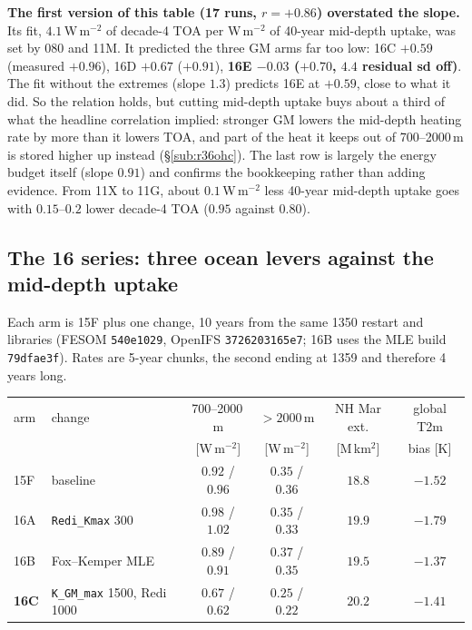 \documentclass[10pt]{article}
\begin{document}
\noindent\textbf{The first version of this table (17 runs, $r=+0.86$) overstated the slope.} Its
fit, $4.1$\,W\,m$^{-2}$ of decade-4 TOA per W\,m$^{-2}$ of 40-year mid-depth uptake, was set
by 080 and 11M. It predicted the three GM arms far too low: 16C $+0.59$ (measured $+0.96$), 16D
$+0.67$ ($+0.91$), \textbf{16E $-0.03$ ($+0.70$, $4.4$ residual sd off)}. The fit without the
extremes (slope $1.3$) predicts 16E at $+0.59$, close to what it did. So the relation holds, but
cutting mid-depth uptake buys about a third of what the headline correlation implied: stronger
GM lowers the mid-depth heating rate by more than it lowers TOA, and part of the heat it keeps
out of 700--2000\,m is stored higher up instead (\S\ref{sub:r36ohc}). The last row is largely the energy
budget itself (slope $0.91$) and confirms the bookkeeping rather than adding evidence. From 11X
to 11G, about $0.1$\,W\,m$^{-2}$ less 40-year mid-depth uptake goes with $0.15$--$0.2$ lower
decade-4 TOA ($0.95$ against $0.80$).

\subsection{The 16 series: three ocean levers against the mid-depth uptake}\label{sub:r36levers}

Each arm is 15F plus one change, 10 years from the same 1350 restart and libraries (FESOM
\texttt{540e1029}, OpenIFS \texttt{3726203165e7}; 16B uses the MLE build \texttt{79dfae3f}).
Rates are 5-year chunks, the second ending at 1359 and therefore 4 years long.

\begin{center}\small
\begin{tabular}{llcccc}
\toprule
arm & change & 700--2000\,m & $>2000$\,m & NH Mar ext. & global T2m \\
 & & [W\,m$^{-2}$] & [W\,m$^{-2}$] & [M\,km$^2$] & bias [K] \\
\midrule
15F & baseline & $0.92$ / $0.96$ & $0.35$ / $0.36$ & $18.8$ & $-1.52$ \\
16A & \texttt{Redi\_Kmax} 300 & $0.98$ / $1.02$ & $0.35$ / $0.33$ & $19.9$ & $-1.79$ \\
16B & Fox--Kemper MLE & $0.89$ / $0.91$ & $0.37$ / $0.35$ & $19.5$ & $-1.37$ \\
\textbf{16C} & \texttt{K\_GM\_max} 1500, Redi 1000 & $\mathbf{0.67}$ / $\mathbf{0.62}$ & $\mathbf{0.25}$ / $\mathbf{0.22}$ & $20.2$ & $-1.41$ \\
\bottomrule
\end{tabular}
\end{center}
\end{document}
